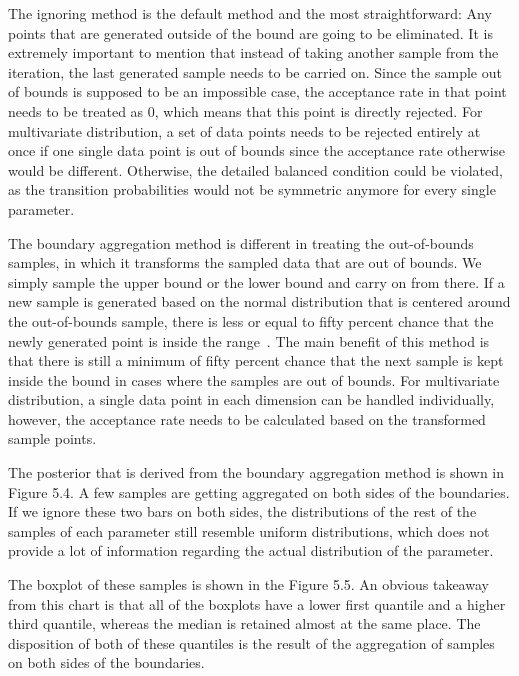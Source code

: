 The ignoring method is the default method and the most straightforward: Any points that are generated outside of the bound are going to be eliminated. It is extremely important to mention that instead of taking another sample from the iteration, the last generated sample needs to be carried on. Since the sample out of bounds is supposed to be an impossible case, the acceptance rate in that point needs to be treated as 0, which means that this point is directly rejected. For multivariate distribution, a set of data points needs to be rejected entirely at once if one single data point is out of bounds since the acceptance rate otherwise would be different. Otherwise, the detailed balanced condition could be violated, as the transition probabilities would not be symmetric anymore for every single parameter.

The boundary aggregation method is different in treating the out-of-bounds samples, in which it transforms the sampled data that are out of bounds. We simply sample the upper bound or the lower bound and carry on from there. If a new sample is generated based on the normal distribution that is centered around the out-of-bounds sample, there is less or equal to fifty percent chance that the newly generated point is inside the range~\cite{gaussian_distribution_property}. The main benefit of this method is that there is still a minimum of fifty percent chance that the next sample is kept inside the bound in cases where the samples are out of bounds. For multivariate distribution, a single data point in each dimension can be handled individually, however, the acceptance rate needs to be calculated based on the transformed sample points. 

The posterior that is derived from the boundary aggregation method is shown in Figure 5.4.  A few samples are getting aggregated on both sides of the boundaries. If we ignore these two bars on both sides, the distributions of the rest of the samples of each parameter still resemble uniform distributions, which does not provide a lot of information regarding the actual distribution of the parameter. 

The boxplot of these samples is shown in the Figure 5.5. An obvious takeaway from this chart is that all of the boxplots have a lower first quantile and a higher third quantile, whereas the median is retained almost at the same place. The disposition of both of these quantiles is the result of the aggregation of samples on both sides of the boundaries.



